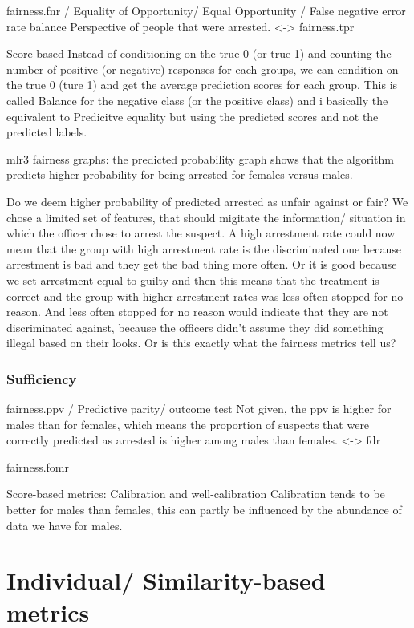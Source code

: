 \documentclass{article}
\begin{document}
fairness.fnr / Equality of Opportunity/ Equal Opportunity / False negative error rate balance
Perspective of people that were arrested.
<-> fairness.tpr

Score-based
Instead of conditioning on the true 0 (or true 1) and counting the number of positive (or negative) responses for each groups, we can condition on the true 0 (ture 1) and get the average prediction scores for each group. This is called Balance for the negative class (or the positive class) and i basically the equivalent to Predicitve equality but using the predicted scores and not the predicted labels.

mlr3 fairness graphs:
the predicted probability graph shows that the algorithm predicts higher probability for being arrested for females versus males.

Do we deem higher probability of predicted arrested as unfair against or fair?
We chose a limited set of features, that should migitate the information/ situation in which the officer chose to arrest the suspect. A high arrestment rate could now mean that the group with high arrestment rate is the discriminated one because arrestment is bad and they get the bad thing more often. Or it is good because we set arrestment equal to guilty and then this means that the treatment is correct and the group with higher arrestment rates was less often stopped for no reason. And less often stopped for no reason would indicate that they are not discriminated against, because the officers didn't assume they did something illegal based on their looks. Or is this exactly what the fairness metrics tell us? 


\subsubsection{Sufficiency}

fairness.ppv / Predictive parity/ outcome test
Not given, the ppv is higher for males than for females, which means the proportion of suspects that were correctly predicted as arrested is higher among males than females.
<-> fdr

fairness.fomr

Score-based metrics:
Calibration and well-calibration
Calibration tends to be better for males than females, this can partly be influenced by the abundance of data we have for males.




\section{Individual/ Similarity-based metrics}
\end{document}
